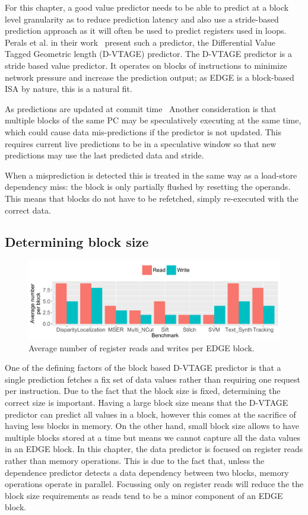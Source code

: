 For this chapter, a good value predictor needs to be able to predict at a block level granularity as to reduce prediction latency and also use a stride-based prediction approach as it will often be used to predict registers used in loops.
Perals et al. in their work~\cite{peraisBeBop2015} present such a predictor, the Differential Value Tagged Geometric length (D-VTAGE) predictor.
The D-VTAGE predictor is a stride based value predictor.
It operates on blocks of instructions to minimize network pressure and increase the prediction output; as EDGE is a block-based ISA by nature, this is a natural fit.

As predictions are updated at commit time~\cite{paraisBeBop2015}
Another consideration is that multiple blocks of the same PC may be speculatively executing at the same time, which could cause data mis-predictions if the predictor is not updated.
This requires current live predictions to be in a speculative window so that new predictions may use the last predicted data and stride.

When a misprediction is detected this is treated in the same way as a load-store dependency miss: the block is only partially flushed by resetting the operands.
This means that blocks do not have to be refetched, simply re-executed with the correct data.

\subsection{Determining block size}
\begin{figure}[t]
    \centering
    \includegraphics[width=1\textwidth]{chapter3/graphics/averageRegRead.pdf}

    \caption{Average number of register reads and writes per EDGE block.}
    \label{fig:edge_reg_read}
	\vspace{1em}
\end{figure}
One of the defining factors of the block based D-VTAGE predictor is that a single prediction fetches a fix set of data values rather than requiring one request per instruction.
Due to the fact that the block size is fixed, determining the correct size is important.
Having a large block size means that the D-VTAGE predictor can predict all values in a block, however this comes at the sacrifice of having less blocks in memory.
On the other hand, small block size allows to have multiple blocks stored at a time but means we cannot capture all the data values in an EDGE block.
In this chapter, the data predictor is focused on register reads rather than memory operations.
This is due to the fact that, unless the dependence predictor detects a data dependency between two blocks, memory operations operate in parallel.
Focussing only on register reads will reduce the the block size requirements as reads tend to be a minor component of an EDGE block.

